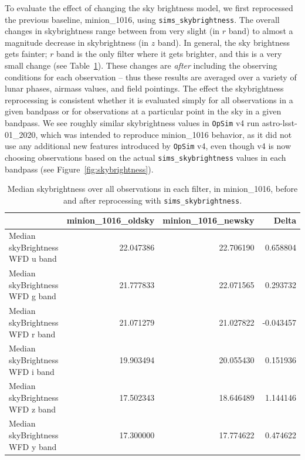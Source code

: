 \documentclass[DM,lsstdraft,authoryear,toc]{lsstdoc}
\newcommand{\opsim}{\texttt{OpSim}\xspace}
\newcommand{\simsky}{\texttt{sims\_skybrightness}\xspace}
\begin{document}

To evaluate the effect of changing the sky brightness model, we first reprocessed the previous baseline, minion\_1016, using \simsky. The overall changes in skybrightness range between from very slight (in $r$ band) to almost a magnitude decrease in skybrightness (in $z$ band). In general, the sky brightness gets fainter; $r$ band is the only filter where it gets brighter, and this is a very small change (see Table~\ref{tab:medskybright}). These changes are {\it after} including the observing conditions for each observation -- thus these results are averaged over a variety of lunar phases, airmass values, and field pointings. The effect the skybrightness reprocessing is consistent whether it is evaluated simply for all observations in a given bandpass or  for observations at a particular point in the sky in a given bandpass. We see roughly similar skybrightness values in \opsim v4 run astro-lsst-01\_2020, which was intended to reproduce minion\_1016 behavior, as it did not use any additional new features introduced by \opsim v4, even though v4 is now choosing observations based on the actual \simsky values in each bandpass (see Figure~\ref{fig:skybrightness}). 

\begin{table}[htp]
\caption{Median skybrightness over all observations in each filter, in minion\_1016, before and after reprocessing with \simsky.}
\begin{center}
\begin{tabular}{lrrr}
\toprule
{} &  minion\_1016\_oldsky &  minion\_1016\_newsky &    Delta \\
\midrule
Median skyBrightness WFD u band       &           22.047386 &           22.706190 &  0.658804 \\
Median skyBrightness WFD g band       &           21.777833 &           22.071565 &  0.293732 \\
Median skyBrightness WFD r band       &           21.071279 &           21.027822 & -0.043457 \\
Median skyBrightness WFD i band       &           19.903494 &           20.055430 &  0.151936 \\
Median skyBrightness WFD z band       &           17.502343 &           18.646489 &  1.144146 \\
Median skyBrightness WFD y band       &           17.300000 &           17.774622 &  0.474622 \\
\bottomrule
\end{tabular}
\end{center}
\label{tab:medskybright}
\end{table}
\end{document}
